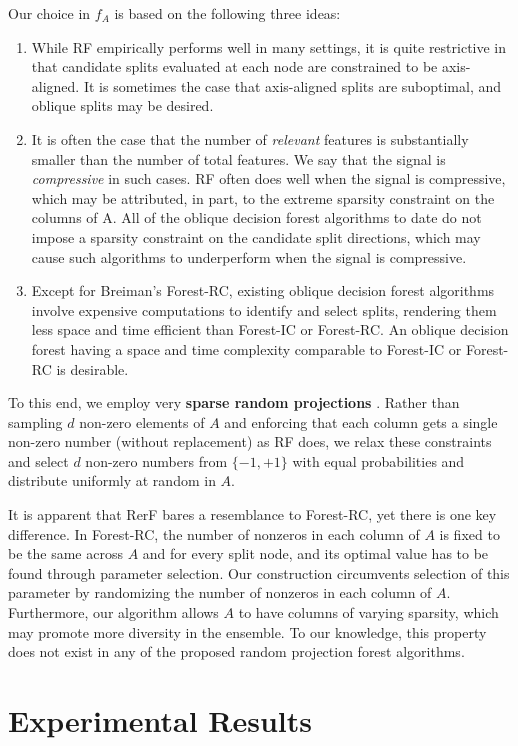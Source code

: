 \documentclass{article}
\begin{document}
Our choice in $f_A$ is based on the following three ideas:
\begin{enumerate}
  \item While RF empirically performs well in many settings, it is quite restrictive in that candidate splits evaluated at each node are constrained to be axis-aligned. It is sometimes the case that axis-aligned splits are suboptimal, and oblique splits may be desired.
  \item It is often the case that the number of \textit{relevant} features is substantially smaller than the number of total features. We say that the signal is \textit{compressive} in such cases. RF often does well when the signal is compressive, which may be attributed, in part, to the extreme sparsity constraint on the columns of A. All of the oblique decision forest algorithms to date do not impose a sparsity constraint on the candidate split directions, which may cause such algorithms to underperform when the signal is compressive.
  \item Except for Breiman's Forest-RC, existing oblique decision forest algorithms involve expensive computations to identify and select splits, rendering them less space and time efficient than Forest-IC or Forest-RC. An oblique decision forest having a space and time complexity comparable to Forest-IC or Forest-RC is desirable.
\end{enumerate}

To this end, we employ very {\bf{sparse random projections}} \cite{Li2006}. Rather than sampling $d$ non-zero elements of $A$ and enforcing that each column gets a single non-zero number (without replacement) as RF does, we relax these constraints and select $d$ non-zero numbers from $\{-1,+1\}$ with equal probabilities and distribute uniformly at random in $A$.

It is apparent that RerF bares a resemblance to Forest-RC, yet there is one key difference. In Forest-RC, the number of nonzeros in each column of $A$ is fixed to be the same across $A$ and for every split node, and its optimal value has to be found through parameter selection. Our construction circumvents selection of this parameter by randomizing the number of nonzeros in each column of $A$. Furthermore, our algorithm allows $A$ to have columns of varying sparsity, which may promote more diversity in the ensemble. To our knowledge, this property does not exist in any of the proposed random projection forest algorithms. 

\section{Experimental Results}
\end{document}
